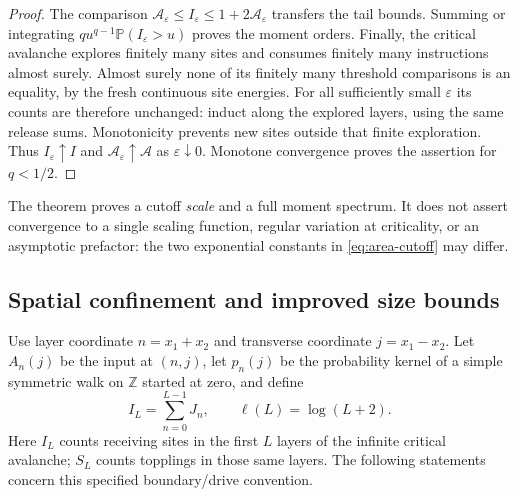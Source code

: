 \documentclass[11pt]{article}
\numberwithin{equation}{section}
\theoremstyle{definition}
\newcommand{\Prob}{\mathbb P}
\newcommand{\Z}{\mathbb Z}
\begin{document}
\begin{proof}
The comparison $\mathcal A_\varepsilon\le I_\varepsilon\le1+2\mathcal A_\varepsilon$ transfers the tail bounds. Summing or integrating $q u^{q-1}\Prob(I_\varepsilon>u)$ proves the moment orders. Finally, the critical avalanche explores finitely many sites and consumes finitely many instructions almost surely. Almost surely none of its finitely many threshold comparisons is an equality, by the fresh continuous site energies. For all sufficiently small $\varepsilon$ its counts are therefore unchanged: induct along the explored layers, using the same release sums. Monotonicity prevents new sites outside that finite exploration. Thus $I_\varepsilon\uparrow I$ and $\mathcal A_\varepsilon\uparrow\mathcal A$ as $\varepsilon\downarrow0$. Monotone convergence proves the assertion for $q<1/2$.
\end{proof}
The theorem proves a cutoff \emph{scale} and a full moment spectrum. It does not assert convergence to a single scaling function, regular variation at criticality, or an asymptotic prefactor: the two exponential constants in \eqref{eq:area-cutoff} may differ.

\subsection{Spatial confinement and improved size bounds}\label{sec:spatial-bounds}
Use layer coordinate $n=x_1+x_2$ and transverse coordinate $j=x_1-x_2$. Let $A_n(j)$ be the input at $(n,j)$, let $p_n(j)$ be the probability kernel of a simple symmetric walk on $\Z$ started at zero, and define
\[
 I_L=\sum_{n=0}^{L-1}J_n,\qquad \ell(L)=\log(L+2).
\]
Here $I_L$ counts receiving sites in the first $L$ layers of the infinite critical avalanche; $S_L$ counts topplings in those same layers. The following statements concern this specified boundary/drive convention.
\end{document}

